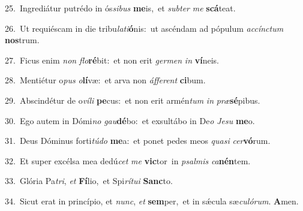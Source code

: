 {\numbfont\textcolor{\numbcolor}{25.}}~Ingrediátur putrédo in ós\-\textit{si}\-\textit{bus} \textbf{me}\-is,~\star et \textit{sub}\-\textit{ter} \textit{me} \textbf{scá}\-teat.\par
{\numbfont\textcolor{\numbcolor}{26.}}~Ut requiéscam in die tribu\-\textit{la}\-\textit{ti}\textbf{ó}nis:~\star ut ascéndam ad pópulum \textit{ac}\-\textit{cínc}\textit{tum} \textbf{nos}\-trum.\par
{\numbfont\textcolor{\numbcolor}{27.}}~Ficus enim \textit{non} \textit{flo}\-\textbf{ré}bit:~\star et non erit \textit{ger}\-\textit{men} \textit{in} \textbf{ví}\-neis.\par
{\numbfont\textcolor{\numbcolor}{28.}}~Mentiétur o\textit{pus} \textit{o}\-\textbf{lí}væ:~\star et arva non \textit{áf}\-\textit{fe}\textit{rent} \textbf{ci}\-bum.\par
{\numbfont\textcolor{\numbcolor}{29.}}~Abscindétur de o\-\textit{ví}\-\textit{li} \textbf{pe}\-cus:~\star et non erit armén\textit{tum} \textit{in} \textit{præ}\-\textbf{sé}pibus.\par
{\numbfont\textcolor{\numbcolor}{30.}}~Ego autem in Dómi\textit{no} \textit{gau}\-\textbf{dé}bo:~\star et exsultábo in De\textit{o} \textit{Je}\-\textit{su} \textbf{me}\-o.\par
{\numbfont\textcolor{\numbcolor}{31.}}~Deus Dóminus forti\-\textit{tú}\-\textit{do} \textbf{me}\-a:~\star et ponet pedes meos \textit{qua}\-\textit{si} \textit{cer}\-\textbf{vó}rum.\par
{\numbfont\textcolor{\numbcolor}{32.}}~Et super excélsa mea dedú\textit{cet} \textit{me} \textbf{vic}\-tor~\star in \textit{psal}\-\textit{mis} \textit{ca}\-\textbf{nén}tem.\par
{\numbfont\textcolor{\numbcolor}{33.}}~Glória Pa\-\textit{tri}\-, \textit{et} \textbf{Fí}\-lio,~\star et Spi\-\textit{rí}\-\textit{tu}\textit{i} \textbf{Sanc}\-to.\par
{\numbfont\textcolor{\numbcolor}{34.}}~Sicut erat in princípio, et \textit{nunc}\-, \textit{et} \textbf{sem}\-per,~\star et in sǽcula sæ\-\textit{cu}\-\textit{ló}\textit{rum}. \textbf{A}\-men.\par
